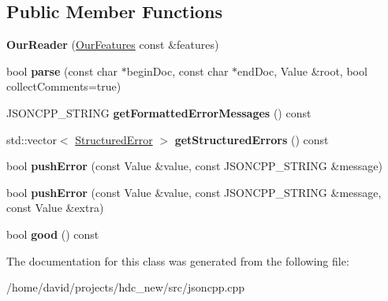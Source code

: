 \subsection*{Public Member Functions}
\begin{DoxyCompactItemize}
\item 
{\bfseries Our\+Reader} (\hyperlink{class_json_1_1_our_features}{Our\+Features} const \&features)\hypertarget{class_json_1_1_our_reader_a48a850914b9c8d7781be172930c478e5}{}\label{class_json_1_1_our_reader_a48a850914b9c8d7781be172930c478e5}

\item 
bool {\bfseries parse} (const char $\ast$begin\+Doc, const char $\ast$end\+Doc, Value \&root, bool collect\+Comments=true)\hypertarget{class_json_1_1_our_reader_aba4f8749aab7f02ec17f107e392caf80}{}\label{class_json_1_1_our_reader_aba4f8749aab7f02ec17f107e392caf80}

\item 
J\+S\+O\+N\+C\+P\+P\+\_\+\+S\+T\+R\+I\+NG {\bfseries get\+Formatted\+Error\+Messages} () const \hypertarget{class_json_1_1_our_reader_a61b627b274f3bf110d559e4ab50e29b8}{}\label{class_json_1_1_our_reader_a61b627b274f3bf110d559e4ab50e29b8}

\item 
std\+::vector$<$ \hyperlink{struct_json_1_1_our_reader_1_1_structured_error}{Structured\+Error} $>$ {\bfseries get\+Structured\+Errors} () const \hypertarget{class_json_1_1_our_reader_a02ef7871af3706754a233c36e6d489e9}{}\label{class_json_1_1_our_reader_a02ef7871af3706754a233c36e6d489e9}

\item 
bool {\bfseries push\+Error} (const Value \&value, const J\+S\+O\+N\+C\+P\+P\+\_\+\+S\+T\+R\+I\+NG \&message)\hypertarget{class_json_1_1_our_reader_a700e9d8e0977fa7e0375d26690d7025f}{}\label{class_json_1_1_our_reader_a700e9d8e0977fa7e0375d26690d7025f}

\item 
bool {\bfseries push\+Error} (const Value \&value, const J\+S\+O\+N\+C\+P\+P\+\_\+\+S\+T\+R\+I\+NG \&message, const Value \&extra)\hypertarget{class_json_1_1_our_reader_addccecfca74b79adaad6115ddd614477}{}\label{class_json_1_1_our_reader_addccecfca74b79adaad6115ddd614477}

\item 
bool {\bfseries good} () const \hypertarget{class_json_1_1_our_reader_a048346238d703ad9aed06beb686e6102}{}\label{class_json_1_1_our_reader_a048346238d703ad9aed06beb686e6102}

\end{DoxyCompactItemize}


The documentation for this class was generated from the following file\+:\begin{DoxyCompactItemize}
\item 
/home/david/projects/hdc\+\_\+new/src/jsoncpp.\+cpp\end{DoxyCompactItemize}
